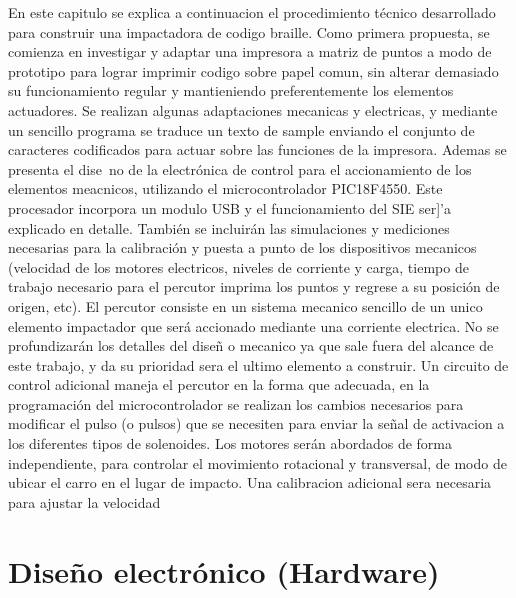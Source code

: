 En este capitulo se explica a continuacion el procedimiento t\'ecnico
desarrollado para construir una impactadora de codigo braille.
Como primera propuesta, se comienza en investigar y adaptar una impresora a
matriz de puntos a modo de prototipo para lograr imprimir codigo sobre papel
comun, sin alterar demasiado su funcionamiento regular y mantieniendo
preferentemente los elementos actuadores.
Se realizan algunas adaptaciones mecanicas y electricas, y mediante un sencillo
programa se traduce un texto de sample enviando el conjunto de caracteres
codificados para actuar sobre las funciones de la impresora.
Ademas se presenta el dise~no de la electr\'onica de control para el
accionamiento de los elementos meacnicos, utilizando el microcontrolador
PIC18F4550. Este procesador incorpora un modulo USB y el funcionamiento del SIE
ser]'a explicado en detalle.
Tambi\'en se incluir\'an las simulaciones y mediciones necesarias para la
calibraci\'on y puesta a punto de los dispositivos mecanicos (velocidad de los
motores electricos, niveles de corriente y carga, tiempo de trabajo necesario
para el percutor imprima los puntos y regrese a su posici\'on de origen, etc).
El percutor consiste en un sistema mecanico sencillo de un unico elemento
impactador que ser\'a accionado mediante una corriente electrica. 
No se profundizar\'an los detalles del dise\~n o mecanico ya que sale fuera
del alcance de este trabajo, y da su prioridad sera el ultimo elemento a
construir.
Un circuito de control adicional maneja el percutor en la forma que adecuada,
en la programaci\'on del microcontrolador se realizan los cambios necesarios 
para modificar el pulso (o pulsos) que se necesiten para enviar la se\~nal de 
activacion a los diferentes tipos de solenoides.
Los motores ser\'an abordados de forma independiente, para controlar el
movimiento 
rotacional y transversal, de modo de ubicar el carro en el lugar de impacto. 
Una calibracion adicional sera necesaria para ajustar la velocidad

\section {Dise\~no electr\'onico (Hardware)}

%
%
%
